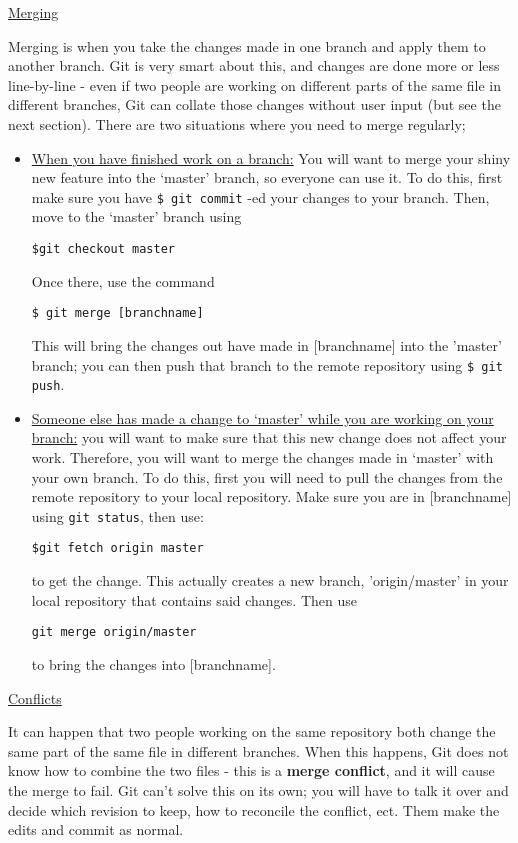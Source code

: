\documentclass[11pt, a4paper, english]{article}
\begin{document}
\underline{Merging}

Merging is when you take the changes made in one branch and apply them to another branch. Git is very smart about this, and changes are done more or less line-by-line - even if two people are working on different parts of the same file in different branches, Git can collate those changes without user input (but see the next section). There are two situations where you need to merge regularly;

\begin{itemize}
\item \underline{When you have finished work on a branch:} You will want to merge your shiny new feature into the ‘master’ branch, so everyone can use it. To do this, first make sure you have \verb|$ git commit| -ed your changes to your branch. Then, move to the ‘master’ branch using
\begin{verbatim}
$git checkout master
\end{verbatim}
Once there, use the command
\begin{verbatim}
$ git merge [branchname]
\end{verbatim}

This will bring the changes out have made in [branchname] into the 'master' branch; you can then push that branch to the remote repository using \verb|$ git push|.

\item \underline{Someone else has made a change to ‘master’ while you are working on your branch:} you will want to make sure that this new change does not affect your work. Therefore, you will want to merge the changes made in ‘master’ with your own branch.
To do this, first you will need to pull the changes from the remote repository to your local repository. Make sure you are in [branchname] using \verb|git status|, then use:
\begin{verbatim}
$git fetch origin master
\end{verbatim}
to get the change. This actually creates a new branch, 'origin/master' in your local repository that contains said changes. Then use
\begin{verbatim}
git merge origin/master
\end{verbatim}
to bring the changes into [branchname].
\end{itemize}

\underline{Conflicts}

It can happen that two people working on the same repository both change the same part of the same file in different branches. When this happens, Git does not know how to combine the two files - this is a \textbf{merge conflict}, and it will cause the merge to fail. Git can’t solve this on its own; you will have to talk it over and decide which revision to keep, how to reconcile the conflict, ect. Them make the edits and commit as normal.
\end{document}
